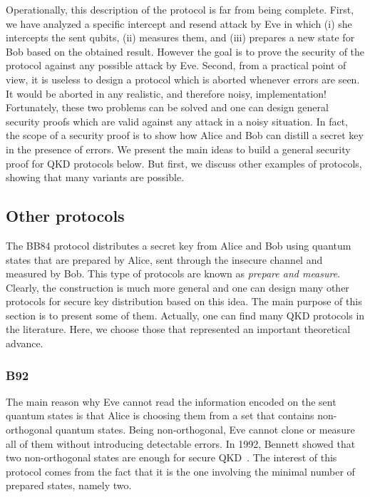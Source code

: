 \documentclass[a4paper]{article}
\begin{document}
Operationally, this description of the protocol is far from being complete. First, we have
analyzed a specific intercept and resend attack by Eve in which (i) she intercepts the sent qubits, (ii) measures them, and (iii) prepares a new state for Bob based on the obtained result. However the goal is to prove
the security of the protocol against any possible attack by Eve.
Second, from a practical point of view, it is useless to design a
protocol which is aborted whenever errors are seen. It would be
aborted in any realistic, and therefore noisy, implementation!
Fortunately, these two problems can be solved and one can design
general security proofs which are valid against any attack in a
noisy situation. In fact, the scope of a security proof is to show how Alice and Bob can distill a secret key in the presence of errors. 
We present the main ideas to build a general
security proof for QKD protocols below. But first,
we discuss other examples of protocols, showing that many variants are possible.

\subsection{Other protocols}

The BB84 protocol distributes a secret key from Alice and Bob
using quantum states that are prepared by Alice, sent through the
insecure channel and measured by Bob. This type of protocols are
known as \emph{prepare and measure}. Clearly, the construction is much more
general and one can design many other protocols for secure key
distribution based on this idea. The main purpose of this section
is to present some of them. Actually, one can find many QKD
protocols in the literature. Here, we choose those that represented
an important theoretical advance.

\subsubsection{B92}

The main reason why Eve cannot read the information 
encoded on the sent quantum states is that Alice is choosing them from a set that contains non-orthogonal quantum states.
Being non-orthogonal, Eve cannot clone or measure all of them
without introducing detectable errors. In 1992, Bennett showed that two non-orthogonal states
are enough for secure QKD~\cite{B92}. The interest of this protocol comes from
the fact that it is the one involving the minimal number of prepared states, namely two.
\end{document}
